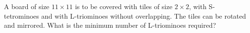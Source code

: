 A board of size $11\times 11$ is to be covered with tiles of size $2\times 2$,
with S-tetrominoes and with L-triominoes without overlapping. The tiles can be rotated and mirrored.
What is the minimum number of L-triominoes required?

